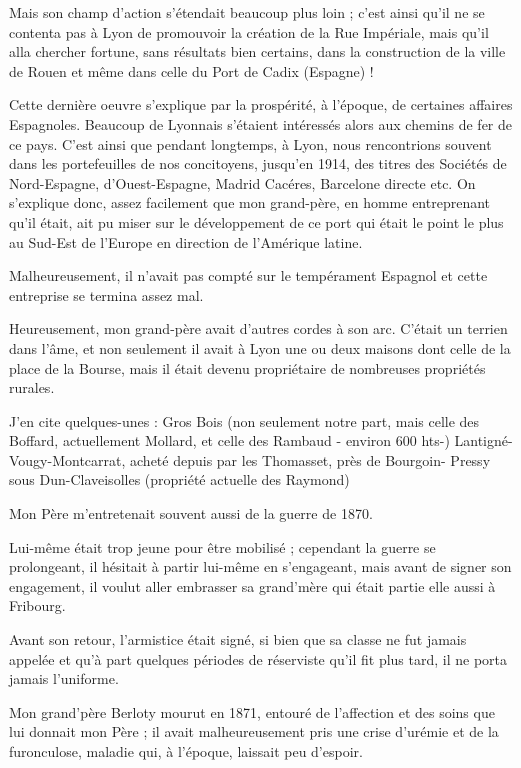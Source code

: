 \documentclass[11pt,a4paper]{report}
\begin{document}
Mais son champ d'action s'étendait beaucoup plus loin ; c'est ainsi qu'il ne se contenta pas à Lyon de promouvoir la création de la Rue Impériale, mais qu'il alla chercher fortune, sans résultats bien certains, dans la construction de la ville de Rouen et même dans celle du Port de Cadix (Espagne) !

Cette dernière oeuvre s'explique par la prospérité, à l'époque, de certaines affaires Espagnoles. Beaucoup de Lyonnais s'étaient intéressés alors aux chemins de fer de ce pays. C'est ainsi que pendant longtemps, à Lyon, nous rencontrions souvent dans les portefeuilles de nos concitoyens, jusqu'en 1914, des titres des Sociétés de Nord-Espagne, d'Ouest-Espagne, Madrid Cacéres, Barcelone directe etc. On s'explique donc, assez facilement que mon grand-père, en homme entreprenant qu'il était, ait pu miser sur le développement de ce port qui était le point le plus au Sud-Est de l'Europe en direction de l'Amérique latine.

Malheureusement, il n'avait pas compté sur le tempérament Espagnol et cette entreprise se termina assez mal.

Heureusement, mon grand-père avait d'autres cordes à son arc. C'était un terrien dans l'âme, et non seulement il avait à Lyon une ou deux maisons dont celle de la place de la Bourse, mais il était devenu propriétaire de nombreuses propriétés rurales.

J'en cite quelques-unes : Gros Bois (non seulement notre part, mais celle des Boffard, actuellement Mollard, et celle des Rambaud - environ 600 hts-) Lantigné-Vougy-Montcarrat, acheté depuis par les Thomasset, près de Bourgoin- Pressy sous Dun-Claveisolles (propriété actuelle des Raymond)

Mon Père m'entretenait souvent aussi de la guerre de 1870.

Lui-même était trop jeune pour être mobilisé ; cependant la guerre se prolongeant, il hésitait à partir lui-même en s'engageant, mais avant de signer son engagement, il voulut aller embrasser sa grand'mère qui était partie elle aussi à Fribourg.

Avant son retour, l'armistice était signé, si bien que sa classe ne fut jamais appelée et qu'à part quelques périodes de réserviste qu'il fit plus tard, il ne porta jamais l'uniforme.

Mon grand'père Berloty mourut en 1871, entouré de l'affection et des soins que lui donnait mon Père ; il avait malheureusement pris une crise d'urémie et de la furonculose, maladie qui, à l'époque, laissait peu d'espoir.
\end{document}
